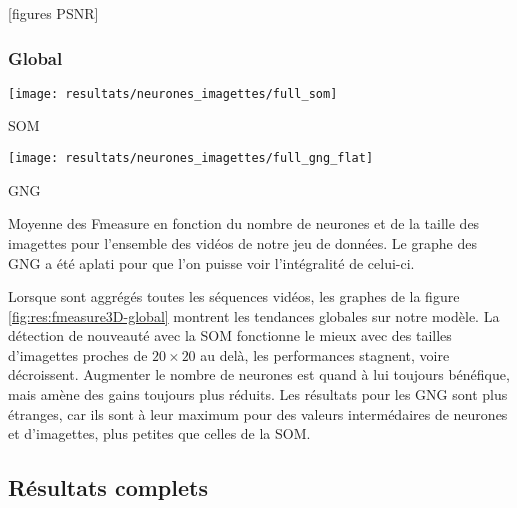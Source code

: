 	[figures PSNR]
	
	\subsubsection{Global}

	\begin{figureth}
		\begin{subfigureth}{.49\textwidth}
			\texttt{[image: resultats/neurones\_imagettes/full\_som]}\caption{SOM}
		\end{subfigureth}
		\begin{subfigureth}{.49\textwidth}
			\texttt{[image: resultats/neurones\_imagettes/full\_gng\_flat]}\caption{GNG}
		\end{subfigureth}
		\caption[Fmeasure en fonction du nombre de neurones et de la taille des imagettes, global]{Moyenne des Fmeasure en fonction du nombre de neurones et de la taille des imagettes pour l'ensemble des vidéos de notre jeu de données. Le graphe des GNG a été aplati pour que l'on puisse voir l'intégralité de celui-ci.}\label{fig:res:fmeasure3D-global}
	\end{figureth}

	Lorsque sont aggrégés toutes les séquences vidéos, les graphes de la figure \ref{fig:res:fmeasure3D-global} montrent les tendances globales sur notre modèle. La détection de nouveauté avec la SOM fonctionne le mieux avec des tailles d'imagettes proches de $20\times20$ au delà, les performances stagnent, voire décroissent. Augmenter le nombre de neurones est quand à lui toujours bénéfique, mais amène des gains toujours plus réduits. Les résultats pour les GNG sont plus étranges, car ils sont à leur maximum pour des valeurs intermédaires de neurones et d'imagettes, plus petites que celles de la SOM.

	\subsection{Résultats complets}

